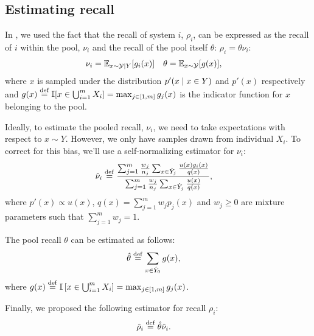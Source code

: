 \subsection{Estimating recall}

In , we used the fact that the recall of system $i$, $\rho_i$, can be expressed as the recall of $i$ within the pool, $\nu_i$ and the recall of the pool itself $\theta$: $\rho_i = \theta \nu_i$:  
\begin{align*}
  \nu_i &= \mathbb{E}_{x \sim \mathcal{Y} \mid Y}[g_i(x)] &
  \theta &= \mathbb{E}_{x \sim \mathcal{Y}}[g(x)],
\end{align*}
where $x$ is sampled under the distribution $p'(x \mid x \in Y)$ and $p'(x)$ respectively and
  $g(x) \stackrel{\rm def}{=} \mathbb{I}[x \in \bigcup_{i=1}^m X_i] = \max_{j \in [1,m]} g_j(x)$ is the indicator function for $x$ belonging to the pool.

Ideally, to estimate the pooled recall, $\nu_i$, we need to take expectations with respect to $x \sim Y$.
However, we only have samples drawn from individual $X_i$.
To correct for this bias, we'll use a self-normalizing estimator for $\nu_i$:
\begin{align*}
  {\hat{\nu}}_i &\stackrel{\rm def}{=} \frac{\sum_{j=1}^m \frac{w_j}{n_j} \sum_{x \in {\hat{Y}}_j} \frac{u(x) g_i(x)}{q(x)}}{\sum_{j=1}^m \frac{w_j}{n_j} \sum_{x \in {\hat{Y}}_j} \frac{u(x)}{q(x)}},
\end{align*}
where $p'(x) \propto u(x)$, $q(x) = \sum_{j=1}^m w_{j} p_j(x)$ and $w_{j} \ge 0$ are mixture parameters such that $\sum_{j=1}^m w_{j} = 1$.

The pool recall $\theta$ can be estimated as follows:
\begin{align*}
  {\hat{\theta}} &\stackrel{\rm def}{=} \sum_{x \in {\hat{Y}}_0} g(x),
\end{align*}
where $g(x) \stackrel{\rm def}{=} \mathbb{I}\left[ x \in \bigcup_{i=1}^m X_i \right] = \max_{j \in [1,m]} g_j(x)$.

Finally, we proposed the following estimator for recall $\rho_i$:
\begin{align*}
  {\hat{\rho}}_i &\stackrel{\rm def}{=} {\hat{\theta}}{\hat{\nu}}_i.
\end{align*}

